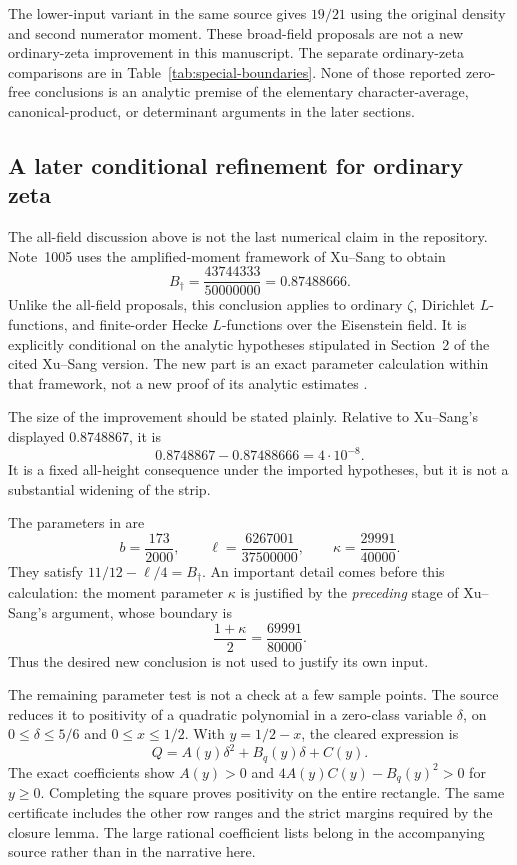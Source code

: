 The lower-input variant in the same source gives $19/21$ using the original density and second numerator moment. These broad-field proposals are not a new ordinary-zeta improvement in this manuscript. The separate ordinary-zeta comparisons are in Table~\ref{tab:special-boundaries}. None of those reported zero-free conclusions is an analytic premise of the elementary character-average, canonical-product, or determinant arguments in the later sections.


\subsection{A later conditional refinement for ordinary zeta}
The all-field discussion above is not the last numerical claim in the repository. Note~1005 uses the amplified-moment framework of Xu--Sang to obtain
\begin{equation}\label{eq:1005-boundary}
 B_\dagger=\frac{43744333}{50000000}=0.87488666.
\end{equation}
Unlike the all-field proposals, this conclusion applies to ordinary $\zeta$, Dirichlet $L$-functions, and finite-order Hecke $L$-functions over the Eisenstein field. It is explicitly conditional on the analytic hypotheses stipulated in Section~2 of the cited Xu--Sang version. The new part is an exact parameter calculation within that framework, not a new proof of its analytic estimates \cite{XS26,R1005}.

The size of the improvement should be stated plainly. Relative to Xu--Sang's displayed $0.8748867$, it is
\[
 0.8748867-0.87488666=4\cdot10^{-8}.
\]
It is a fixed all-height consequence under the imported hypotheses, but it is not a substantial widening of the strip.

The parameters in \cite{R1005} are
\[
 b=\frac{173}{2000},\qquad
 \ell=\frac{6267001}{37500000},\qquad
 \kappa=\frac{29991}{40000}.
\]
They satisfy $11/12-\ell/4=B_\dagger$. An important detail comes before this calculation: the moment parameter $\kappa$ is justified by the \emph{preceding} stage of Xu--Sang's argument, whose boundary is
\[
 \frac{1+\kappa}{2}=\frac{69991}{80000}.
\]
Thus the desired new conclusion is not used to justify its own input.

The remaining parameter test is not a check at a few sample points. The source reduces it to positivity of a quadratic polynomial in a zero-class variable $\delta$, on $0\le\delta\le5/6$ and $0\le x\le1/2$. With $y=1/2-x$, the cleared expression is
\[
 Q=A(y)\delta^2+B_q(y)\delta+C(y).
\]
The exact coefficients show $A(y)>0$ and $4A(y)C(y)-B_q(y)^2>0$ for $y\ge0$. Completing the square proves positivity on the entire rectangle. The same certificate includes the other row ranges and the strict margins required by the closure lemma. The large rational coefficient lists belong in the accompanying source rather than in the narrative here.

